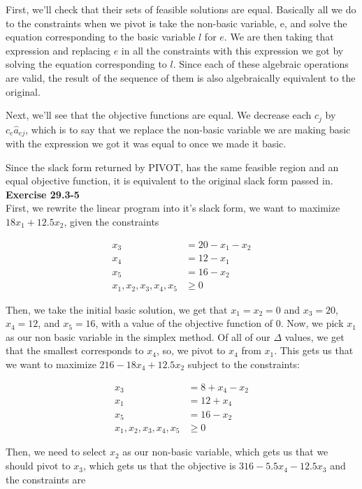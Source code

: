 \documentclass{article}
\begin{document}
First, we'll check that their sets of feasible solutions are equal. Basically all we do to the constraints when we pivot is take the non-basic variable, e, and solve the equation corresponding to the basic variable $l$ for $e$. We are then taking that expression and replacing $e$ in all the constraints with this expression we got by solving the equation corresponding to $l$. Since each of these algebraic operations are valid, the result of the sequence of them is also algebraically equivalent to the original.

Next, we'll see that the objective functions are equal. We decrease each $c_j$ by $c_e \hat{a}_{ej}$, which is to say that we replace the non-basic variable we are making basic with the expression we got it was equal to once we made it basic.

Since the slack form returned by PIVOT, has the same feasible region and an equal objective function, it is equivalent to the original slack form passed in.\\

\noindent\textbf{Exercise 29.3-5}\\
First, we rewrite the linear program into it's slack form, we want to maximize $18x_1 + 12.5x_2$, given the constraints

\begin{align*}
x_3 & = 20 - x_1 - x_2\\
x_4 & = 12 - x_1 \\
x_5 & = 16 - x_2\\
x_1,x_2,x_3,x_4,x_5 &\ge 0
\end{align*}

Then, we take the initial basic solution, we get that $x_1 = x_2 = 0$ and $x_3 = 20$, $x_4 = 12$, and $x_5 =16$, with a value of the objective function of $0$. Now, we pick $x_1$ as our non basic variable in the simplex method. Of all of our $\Delta$ values, we get that the smallest corresponds to $x_4$, so, we pivot to $x_4$ from $x_1$. This gets us that we want to maximize $216 - 18x_4 +12.5x_2$ subject to the constraints:

\begin{align*}
x_3 & = 8+ x_4 - x_2\\
x_1 & = 12 + x_4 \\
x_5 & = 16 - x_2\\
x_1,x_2,x_3,x_4,x_5 &\ge 0
\end{align*}

Then, we need to select $x_2$ as our non-basic variable, which gets us that we should pivot to $x_3$, which gets us that the objective is $316 -5.5 x_4 - 12.5 x_3$ and the constraints are
\end{document}
